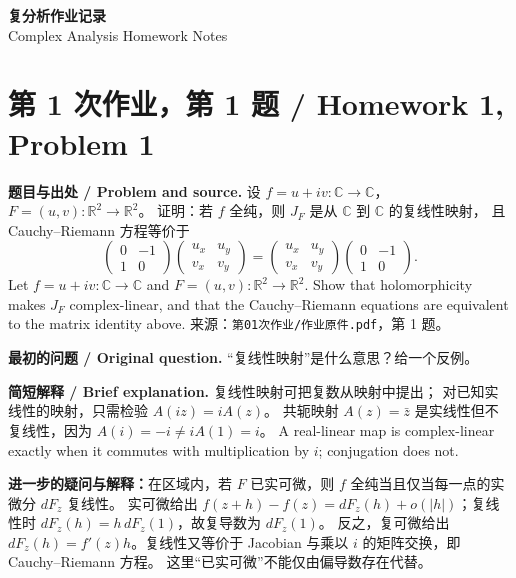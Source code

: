 \documentclass[11pt,a4paper]{ctexart}
\begin{document}
\begin{center}
{\LARGE\bfseries 复分析作业记录}\\[4pt]
{\large Complex Analysis Homework Notes}
\end{center}

\section{第 1 次作业，第 1 题 / Homework 1, Problem 1}
\label{note:complex-analysis-hw01-q01}
\textbf{题目与出处 / Problem and source.}
设 $f=u+iv:\mathbb C\to\mathbb C$，$F=(u,v):\mathbb R^2\to\mathbb R^2$。
证明：若 $f$ 全纯，则 $J_F$ 是从 $\mathbb C$ 到 $\mathbb C$ 的复线性映射，
且 Cauchy--Riemann 方程等价于
\[
\begin{pmatrix}0&-1\\1&0\end{pmatrix}
\begin{pmatrix}u_x&u_y\\v_x&v_y\end{pmatrix}
=
\begin{pmatrix}u_x&u_y\\v_x&v_y\end{pmatrix}
\begin{pmatrix}0&-1\\1&0\end{pmatrix}.
\]
Let $f=u+iv:\mathbb C\to\mathbb C$ and $F=(u,v):\mathbb R^2\to\mathbb R^2$.
Show that holomorphicity makes $J_F$ complex-linear, and that the
Cauchy--Riemann equations are equivalent to the matrix identity above.
来源：\texttt{第01次作业/作业原件.pdf}，第 1 题。

\textbf{最初的问题 / Original question.} “复线性映射”是什么意思？给一个反例。

\textbf{简短解释 / Brief explanation.} 复线性映射可把复数从映射中提出；
对已知实线性的映射，只需检验 $A(iz)=iA(z)$。
共轭映射 $A(z)=\bar z$ 是实线性但不复线性，因为
$A(i)=-i\ne iA(1)=i$。
A real-linear map is complex-linear exactly when it commutes with
multiplication by $i$; conjugation does not.

\textbf{进一步的疑问与解释：}在区域内，若 $F$ 已实可微，则 $f$ 全纯当且仅当每一点的实微分 $dF_z$ 复线性。
实可微给出 $f(z+h)-f(z)=dF_z(h)+o(|h|)$；复线性时 $dF_z(h)=h\,dF_z(1)$，故复导数为 $dF_z(1)$。
反之，复可微给出 $dF_z(h)=f'(z)h$。复线性又等价于 Jacobian 与乘以 $i$ 的矩阵交换，即 Cauchy--Riemann 方程。
这里“已实可微”不能仅由偏导数存在代替。
\end{document}

